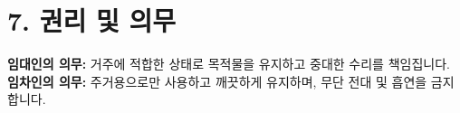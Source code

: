 \section*{7. 권리 및 의무}
\textbf{임대인의 의무:} 거주에 적합한 상태로 목적물을 유지하고 중대한 수리를 책임집니다.
\textbf{임차인의 의무:} 주거용으로만 사용하고 깨끗하게 유지하며, 무단 전대 및 흡연을 금지합니다.
